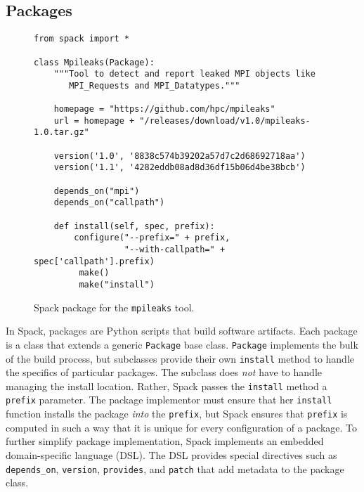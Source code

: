 
\subsection{Packages}\label{sec:packages}

\begin{figure}
\begin{verbatim}
from spack import *

class Mpileaks(Package):
    """Tool to detect and report leaked MPI objects like
       MPI_Requests and MPI_Datatypes."""

    homepage = "https://github.com/hpc/mpileaks"
    url = homepage + "/releases/download/v1.0/mpileaks-1.0.tar.gz"

    version('1.0', '8838c574b39202a57d7c2d68692718aa')
    version('1.1', '4282eddb08ad8d36df15b06d4be38bcb')

    depends_on("mpi")
    depends_on("callpath")

    def install(self, spec, prefix):
        configure("--prefix=" + prefix,
                  "--with-callpath=" + spec['callpath'].prefix)
         make()
         make("install")
\end{verbatim}
	\caption{
		Spack package for the {\tt mpileaks} tool.
		\label{fig:mpileaks}
	}
\end{figure}

In Spack, packages are Python scripts that build software artifacts.  
Each package is a class that extends a generic {\tt Package}
base class.  {\tt Package} implements the bulk of the build process, but
subclasses provide their own {\tt install} method to handle the
specifics of particular packages. The subclass does {\it not} have to
handle managing the install location.  Rather, Spack passes the {\tt install}
method a {\tt prefix} parameter.  The package implementor must ensure that
her {\tt install} function installs the package {\it into} the {\tt prefix},
but Spack ensures that {\tt prefix} is computed in such a way that it is
unique for every configuration of a package.  To further simplify 
package implementation, Spack implements an embedded domain-specific
language (DSL).  The DSL provides special directives such as {\tt depends\_on},
{\tt version}, {\tt provides}, and {\tt patch} that add metadata
to the package class.

